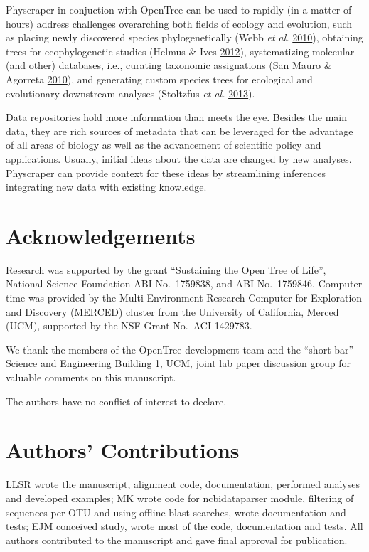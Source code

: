 \documentclass[]{article}
\begin{document}
Physcraper in conjuction with OpenTree can be used to rapidly (in a matter of hours)
address challenges overarching both fields of ecology and evolution, such as
placing newly discovered species phylogenetically (Webb \emph{et al.} \protect\hyperlink{ref-webb2010biodiversity}{2010}),
obtaining trees for ecophylogenetic studies (Helmus \& Ives \protect\hyperlink{ref-helmus2012phylogenetic}{2012}),
systematizing molecular (and other) databases, i.e., curating taxonomic assignations (San Mauro \& Agorreta \protect\hyperlink{ref-san2010molecular}{2010}),
and generating custom species trees for ecological and evolutionary downstream analyses (Stoltzfus \emph{et al.} \protect\hyperlink{ref-stoltzfus2013phylotastic}{2013}).

Data repositories hold more information than meets the eye.
Besides the main data, they are rich sources of metadata that can be leveraged for the advantage of all areas of biology as well as the advancement of scientific policy and applications.
Usually, initial ideas about the data are changed by new analyses.
Physcraper can provide context for these ideas by streamlining inferences integrating new data with existing knowledge.

\hypertarget{acknowledgements}{%
\section{Acknowledgements}\label{acknowledgements}}

Research was supported by the grant ``Sustaining the Open Tree of Life'', National Science Foundation ABI No.~1759838, and ABI No.~1759846.
Computer time was provided by the Multi-Environment Research Computer for Exploration and Discovery (MERCED) cluster from the University of California, Merced (UCM), supported by the NSF Grant No.~ACI-1429783.

We thank the members of the OpenTree development team and the ``short bar'' Science and Engineering Building 1, UCM, joint lab paper discussion group for valuable comments on this manuscript.

The authors have no conflict of interest to declare.

\hypertarget{authors-contributions}{%
\section{Authors' Contributions}\label{authors-contributions}}

LLSR wrote the manuscript, alignment code, documentation, performed analyses and developed examples; MK wrote code for ncbidataparser module, filtering of sequences per OTU and using offline blast searches, wrote documentation and tests; EJM conceived study, wrote most of the code, documentation and tests.
All authors contributed to the manuscript and gave final approval for publication.
\end{document}
